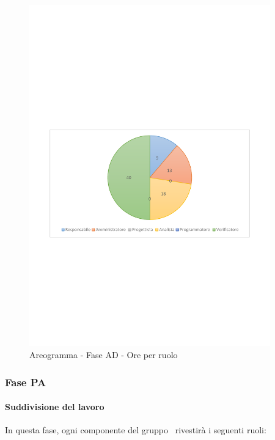 \documentclass[../PianoProgetto.tex]{subfiles}
\begin{document}
	\begin{figure}[!h]
		\centering
		\includegraphics[width=0.93\textwidth , trim=2cm 9.5cm 2cm 11cm]{grafici/AD/AD-ore-ruolo}
			\caption{Areogramma - Fase AD - Ore per ruolo}
		\label{fig:CircleChart-faseAD_ore_r}
	\end{figure}
\vfill	
\newpage	
	\subsubsection{Fase PA}
				\paragraph{Suddivisione del lavoro}
					In questa fase, ogni componente del gruppo \leaf\ rivestirà i seguenti ruoli:
	
\end{document}
